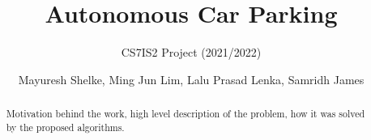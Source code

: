 \documentclass{svproc}
\begin{document}
\mainmatter
\title{Autonomous Car Parking
}
\subtitle{CS7IS2 Project (2021/2022)}
\author{Mayuresh Shelke, Ming Jun Lim, Lalu Prasad Lenka, Samridh James}


\maketitle              %

\begin{abstract}
Motivation behind the work, high level description of the problem, how it was solved by the proposed algorithms.
\end{abstract}
%


%


\end{document}
